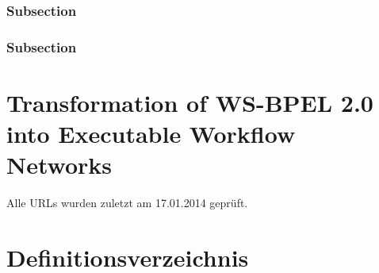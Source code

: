 \documentclass[paper=a5,twoside,fontsize=10pt, DIV=calc, headings=small,bibliography=totoc, listof=totoc]{scrbook}
\begin{document}
\subsection{Subsection}
\subsection{Subsection}

%
\chapter{Transformation of WS-BPEL 2.0 into Executable Workflow Networks}
\label{chap:bpel-ewfn-transformation}
\resetchapterfooter

\printbibliography
Alle URLs wurden zuletzt am 17.01.2014 gepr\"uft.

\clearpage
\listoffigures
\listoftables

\chapter*{Definitionsverzeichnis}

\appendix


%

\end{document}
